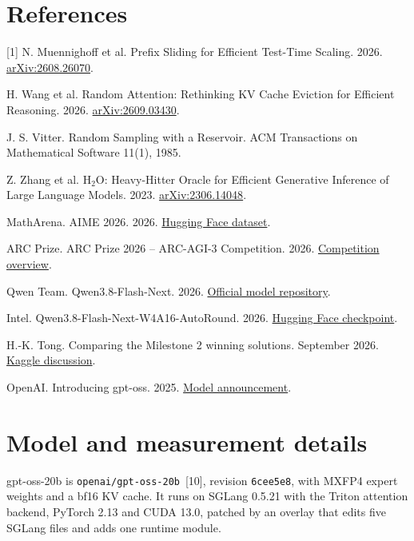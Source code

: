 \documentclass[10pt,letterpaper]{article}
\begin{document}
\section*{References}
{\footnotesize\setlength{\parskip}{2pt}
[1] N. Muennighoff et al. Prefix Sliding for Efficient Test-Time Scaling. 2026. \href{https://arxiv.org/abs/2608.26070}{arXiv:2608.26070}.\par
[2] H. Wang et al. Random Attention: Rethinking KV Cache Eviction for Efficient Reasoning. 2026. \href{https://arxiv.org/abs/2609.03430}{arXiv:2609.03430}.\par
[3] J. S. Vitter. Random Sampling with a Reservoir. ACM Transactions on Mathematical Software 11(1), 1985.\par
[4] Z. Zhang et al. H$_2$O: Heavy-Hitter Oracle for Efficient Generative Inference of Large Language Models. 2023. \href{https://arxiv.org/abs/2306.14048}{arXiv:2306.14048}.\par
[5] MathArena. AIME 2026. 2026. \href{https://huggingface.co/datasets/MathArena/aime_2026}{Hugging Face dataset}.\par
[6] ARC Prize. ARC Prize 2026 -- ARC-AGI-3 Competition. 2026. \href{https://arcprize.org/competitions/2026/arc-agi-3}{Competition overview}.\par
[7] Qwen Team. Qwen3.8-Flash-Next. 2026. \href{https://github.com/QwenLM/Qwen3.8-Flash-Next}{Official model repository}.\par
[8] Intel. Qwen3.8-Flash-Next-W4A16-AutoRound. 2026. \href{https://huggingface.co/Intel/Qwen3.8-Flash-Next-W4A16-AutoRound}{Hugging Face checkpoint}.\par
[9] H.-K. Tong. Comparing the Milestone 2 winning solutions. September 2026. \href{https://www.kaggle.com/competitions/arc-prize-2026-arc-agi-3/discussion/744792}{Kaggle discussion}.\par
[10] OpenAI. Introducing gpt-oss. 2025. \href{https://openai.com/index/introducing-gpt-oss/}{Model announcement}.\par}


\clearpage
\appendix
\section{Model and measurement details}
\label{app:budget}
gpt-oss-20b is \texttt{openai/gpt-oss-20b}~[10], revision \texttt{6cee5e8}, with MXFP4 expert weights and a bf16 KV cache.
It runs on SGLang 0.5.21 with the Triton attention backend, PyTorch 2.13 and CUDA 13.0, patched by an overlay that edits five SGLang files and adds one runtime module.
\end{document}
